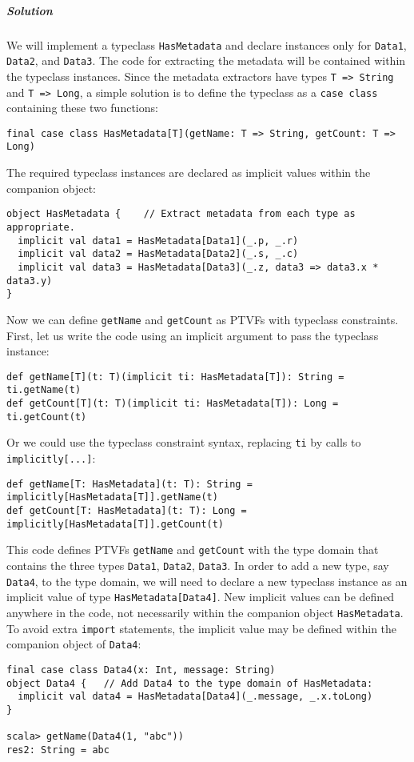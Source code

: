 \subparagraph{Solution}

We will implement a typeclass \lstinline!HasMetadata! and declare
instances only for \lstinline!Data1!, \lstinline!Data2!, and \lstinline!Data3!.
The code for extracting the metadata will be contained within the
typeclass instances. Since the metadata extractors have types \lstinline!T => String!
and \lstinline!T => Long!, a simple solution is to define the typeclass
as a \lstinline!case class! containing these two functions:
\begin{lstlisting}
final case class HasMetadata[T](getName: T => String, getCount: T => Long)
\end{lstlisting}
The required typeclass instances are declared as implicit values within
the companion object:
\begin{lstlisting}
object HasMetadata {    // Extract metadata from each type as appropriate.
  implicit val data1 = HasMetadata[Data1](_.p, _.r)
  implicit val data2 = HasMetadata[Data2](_.s, _.c)
  implicit val data3 = HasMetadata[Data3](_.z, data3 => data3.x * data3.y)
}
\end{lstlisting}
Now we can define \lstinline!getName! and \lstinline!getCount! as
PTVFs with typeclass constraints. First, let us write the code using
an implicit argument to pass the typeclass instance:
\begin{lstlisting}
def getName[T](t: T)(implicit ti: HasMetadata[T]): String = ti.getName(t)
def getCount[T](t: T)(implicit ti: HasMetadata[T]): Long = ti.getCount(t)
\end{lstlisting}
Or we could use the typeclass constraint syntax, replacing \lstinline!ti!
by calls to \lstinline!implicitly[...]!:
\begin{lstlisting}
def getName[T: HasMetadata](t: T): String = implicitly[HasMetadata[T]].getName(t)
def getCount[T: HasMetadata](t: T): Long = implicitly[HasMetadata[T]].getCount(t)
\end{lstlisting}

This code defines PTVFs \lstinline!getName! and \lstinline!getCount!
with the type domain that contains the three types \lstinline!Data1!,
\lstinline!Data2!, \lstinline!Data3!. In order to add a new type,
say \lstinline!Data4!, to the type domain, we will need to declare
a new typeclass instance as an implicit value of type \lstinline!HasMetadata[Data4]!.
New implicit values can be defined anywhere in the code, not necessarily
within the companion object \lstinline!HasMetadata!. To avoid extra
\lstinline!import! statements, the implicit value may be defined
within the companion object of \lstinline!Data4!:
\begin{lstlisting}
final case class Data4(x: Int, message: String)
object Data4 {   // Add Data4 to the type domain of HasMetadata:
  implicit val data4 = HasMetadata[Data4](_.message, _.x.toLong)
}

scala> getName(Data4(1, "abc"))
res2: String = abc
\end{lstlisting}

